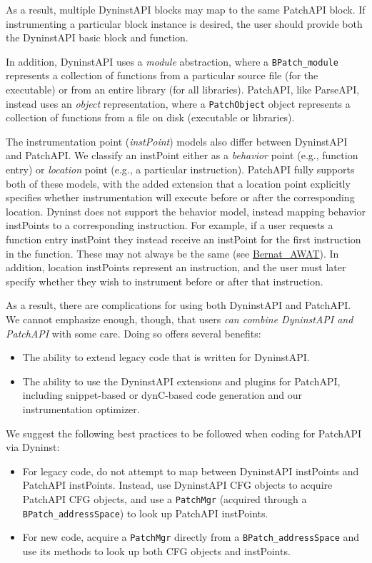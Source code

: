 As a result, multiple DyninstAPI blocks may map to the same PatchAPI
block. If instrumenting a particular block instance is desired, the
user should provide both the DyninstAPI basic block and function.

In addition, DyninstAPI uses a \emph{module} abstraction, where
a \texttt{BPatch\_module} represents a collection of functions from a
particular source file (for the executable) or from an entire library
(for all libraries). PatchAPI, like ParseAPI, instead uses
an \emph{object} representation, where a \texttt{PatchObject} object
represents a collection of functions from a file on disk (executable
or libraries).

The instrumentation point (\emph{instPoint}) models also differ
between DyninstAPI and PatchAPI. We classify an instPoint either as
a \emph{behavior} point (e.g., function entry) or \emph{location}
point (e.g., a particular instruction). PatchAPI fully supports both
of these models, with the added extension that a location point
explicitly specifies whether instrumentation will execute before or
after the corresponding location. Dyninst does not support the
behavior model, instead mapping behavior instPoints to a corresponding
instruction. For example, if a user requests a function entry
instPoint they instead receive an instPoint for the first instruction
in the function. These may not always be the
same (see \href{ftp://ftp.cs.wisc.edu/paradyn/papers/Bernat11AWAT.pdf}{Bernat\_AWAT}). In addition, location instPoints represent an
instruction, and the user must later specify whether they wish to
instrument before or after that instruction.

As a result, there are complications for using both DyninstAPI and
PatchAPI. We cannot emphasize enough, though, that users \emph{can
combine DyninstAPI and PatchAPI} with some care. Doing so offers
several benefits:
\begin{itemize}
\item The ability to extend legacy code that is written for
DyninstAPI.
\item The ability to use the DyninstAPI extensions and plugins for
PatchAPI, including snippet-based or dynC-based code generation and
our instrumentation optimizer.
\end{itemize}
We suggest the following best practices to be followed when coding for
PatchAPI via Dyninst:
\begin{itemize}
\item For legacy code, do not attempt to map between DyninstAPI
instPoints and PatchAPI instPoints. Instead, use DyninstAPI CFG
objects to acquire PatchAPI CFG objects, and use a \texttt{PatchMgr} (acquired
through a \texttt{BPatch\_addressSpace}) to look up
PatchAPI instPoints.
\item For new code, acquire a \texttt{PatchMgr} directly from
a \texttt{BPatch\_addressSpace} and use its methods to look up both
CFG objects and instPoints.
\end{itemize}

